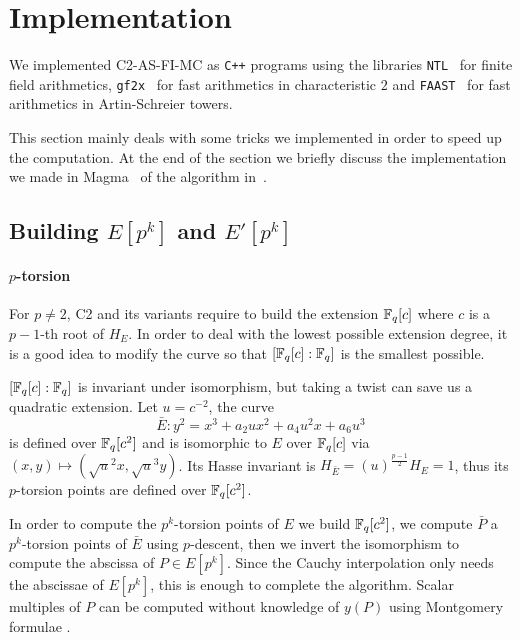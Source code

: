\section{Implementation}
\label{sec:implementation}

We implemented C2-AS-FI-MC as \texttt{C++} programs using the
libraries \texttt{NTL}~\cite{NTL} for finite field arithmetics,
\texttt{gf2x}~\cite{gf2x} for fast arithmetics in characteristic $2$
and \texttt{FAAST}~\cite{DFS09} for fast arithmetics in Artin-Schreier
towers.

This section mainly deals with some tricks we implemented in order to
speed up the computation. At the end of the section we briefly discuss
the implementation we made in Magma~\cite{Magma} of the algorithm
in~\cite{LeSi09}.

\subsection{Building $E[p^k]$ and $E'[p^k]$}
\label{sec:impl:torsion}

\paragraph{$p$-torsion}
For $p\ne2$, C2 and its variants require to build the extension
$\mathbb{F}_q[c]$ where $c$ is a $p-1$-th root of $H_E$. In order to deal with
the lowest possible extension degree, it is a good idea to modify the
curve so that $[\mathbb{F}_q[c]:\mathbb{F}_q]$ is the smallest possible.

$[\mathbb{F}_q[c]:\mathbb{F}_q]$ is invariant under isomorphism, but taking a twist
can save us a quadratic extension. Let $u=c^{-2}$, the curve
\begin{equation*}
  \bar{E} : y^2 = x^3 + a_2ux^2 + a_4u^2x + a_6u^3
\end{equation*}
is defined over $\mathbb{F}_q[c^2]$ and is isomorphic to $E$ over $\mathbb{F}_q[c]$
via $(x,y)\mapsto(\sqrt{u}^2x,\sqrt{u}^3y)$. Its Hasse invariant is
$H_{\bar{E}} = (u)^{\frac{p-1}{2}}H_E = 1$, thus its $p$-torsion
points are defined over $\mathbb{F}_q[c^2]$.

In order to compute the $p^k$-torsion points of $E$ we build
$\mathbb{F}_q[c^2]$, we compute $\bar{P}$ a $p^k$-torsion points of $\bar{E}$
using $p$-descent, then we invert the isomorphism to compute the
abscissa of $P\in E[p^k]$. Since the Cauchy interpolation only needs
the abscissae of $E[p^k]$, this is enough to complete the
algorithm. Scalar multiples of $P$ can be computed without knowledge
of $y(P)$ using Montgomery formulae \cite{Mon87}.

